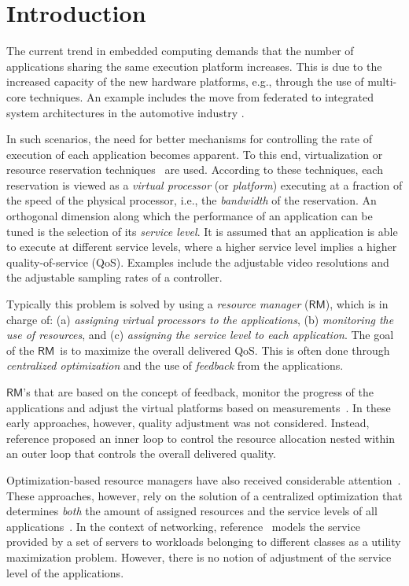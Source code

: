 \documentclass[letter,11pt]{article}
\begin{document}
\section{Introduction}
The current trend in embedded computing demands that the number of applications sharing the same execution platform increases.  This is due to the increased capacity of the new hardware platforms, e.g., through the use of multi-core techniques. 
An example includes the move from federated to integrated system architectures in the automotive industry \cite{DiNatale10}. 

In such scenarios, the need for better mechanisms for controlling the rate of execution of each application becomes apparent. To this end, virtualization or resource reservation techniques~\cite{Mer94,Abe98a} are used. According to these techniques, each reservation is viewed as a \emph{virtual processor} (or \emph{platform}) executing at a fraction of the speed of the physical processor, i.e., the \emph{bandwidth} of the reservation. 
An orthogonal dimension along which the performance of an application can be tuned is the selection of its \emph{service level}. It is assumed that an application is able to execute at different service levels, where a higher service level implies a higher quality-of-service (QoS). Examples include the adjustable video resolutions and the adjustable sampling rates of a controller.

Typically this problem is solved by using a \emph{resource manager} ({$\mathsf{RM}$}), which is in charge of: (a) \textit{assigning virtual processors to the applications}, (b) \textit{monitoring the use of resources}, and (c) \textit{assigning the service level to each application}. The goal of the {$\mathsf{RM}$}\ is to maximize the overall delivered QoS.
This is often done through \textit{centralized optimization} and the
use of \textit{feedback} from the applications.

{$\mathsf{RM}$}'s that are based on the concept of feedback, monitor the progress of the applications and adjust the virtual platforms based on measurements~\cite{Ste99,Eke00}. In these early approaches, however, quality adjustment was not considered. Instead, reference \cite{Cuc10} proposed an inner loop to control the resource allocation nested within an outer loop that controls the overall delivered quality.

Optimization-based resource managers have also received considerable attention~\cite{Raj97a,Lee99}. These approaches, however, rely on the
solution of a centralized optimization that determines \textit{both} the amount of assigned resources and the service levels
of all applications~\cite{Raj97a,Soj11,Bin11}. In the context of networking, reference~\cite{Joh06} models the service provided by a set of servers to workloads belonging to different classes as a utility maximization problem. However, there is no notion of adjustment of the service level of the applications.
\end{document}

